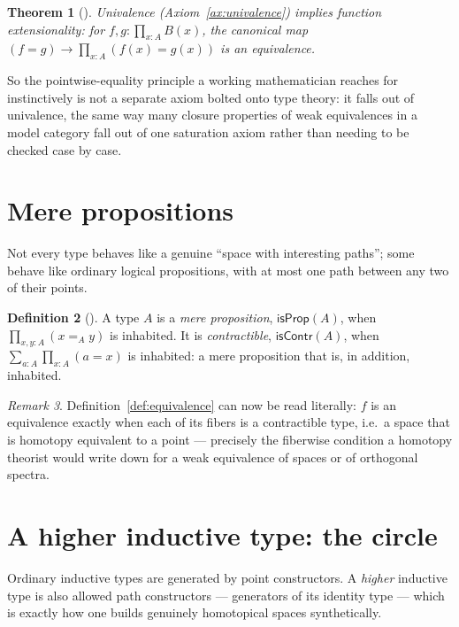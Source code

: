 \documentclass[11pt]{amsart}
\theoremstyle{plain}
\newtheorem{theorem}{Theorem}[section]
\theoremstyle{definition}
\newtheorem{definition}[theorem]{Definition}
\theoremstyle{remark}
\newtheorem{remark}[theorem]{Remark}
\newcommand{\isProp}{\mathsf{isProp}}
\newcommand{\isContr}{\mathsf{isContr}}
\begin{document}
\begin{theorem}[{\cite[\S 2.9, \S 4.9]{HoTTBook}}]\label{thm:univalence-implies-funext}
  Univalence (Axiom~\ref{ax:univalence}) implies function extensionality:
  for $f,g:\prod_{x:A}B(x)$, the canonical map
  $(f=g)\to\prod_{x:A}(f(x)=g(x))$ is an equivalence.
\end{theorem}

So the pointwise-equality principle a working mathematician reaches for
instinctively is not a separate axiom bolted onto type theory: it falls
out of univalence, the same way many closure properties of weak
equivalences in a model category fall out of one saturation axiom
rather than needing to be checked case by case.

\section{Mere propositions}\label{sec:mere-props}

Not every type behaves like a genuine ``space with interesting paths'';
some behave like ordinary logical propositions, with at most one path
between any two of their points.

\begin{definition}[{\cite[\S 3.3, \S 3.11]{HoTTBook}}]\label{def:mere-prop}
  A type $A$ is a \emph{mere proposition}, $\isProp(A)$, when
  $\prod_{x,y:A}(x=_A y)$ is inhabited. It is \emph{contractible},
  $\isContr(A)$, when $\sum_{a:A}\prod_{x:A}(a=x)$ is inhabited: a mere
  proposition that is, in addition, inhabited.
\end{definition}

\begin{remark}\label{rmk:contractible-fibers}
  Definition~\ref{def:equivalence} can now be read literally: $f$ is an
  equivalence exactly when each of its fibers is a contractible type,
  i.e.\ a space that is homotopy equivalent to a point --- precisely
  the fiberwise condition a homotopy theorist would write down for a
  weak equivalence of spaces or of orthogonal spectra.
\end{remark}

\section{A higher inductive type: the circle}\label{sec:circle}

Ordinary inductive types are generated by point constructors. A
\emph{higher} inductive type is also allowed path constructors ---
generators of its identity type --- which is exactly how one builds
genuinely homotopical spaces synthetically.
\end{document}
